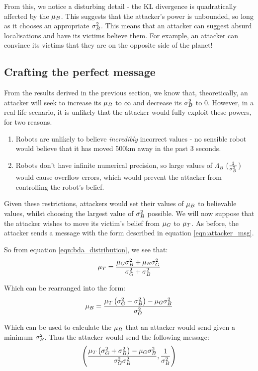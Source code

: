 From this, we notice a disturbing detail - the KL divergence is quadratically affected by the $\mu_B$. This suggests that the attacker's power is unbounded, so long as it chooses an appropriate $\sigma_B^2$. This means that an attacker can suggest absurd localisations and have its victims believe them. For example, an attacker can convince its victims that they are on the opposite side of the planet!

\subsection{Crafting the perfect message}
From the results derived in the previous section, we know that, theoretically, an attacker will seek to increase its $\mu_B$ to $\infty$ and decrease its $\sigma_B^2$ to 0. However, in a real-life scenario, it is unlikely that the attacker would fully exploit these powers, for two reasons.
\begin{enumerate}
	\item Robots are unlikely to believe \textit{incredibly} incorrect values - no sensible robot would believe that it has moved 500km away in the past 3 seconds.
	\item Robots don't have infinite numerical precision, so large values of $\Lambda_B$ ($\frac{1}{\sigma_B^2}$) would cause overflow errors, which would prevent the attacker from controlling the robot's belief.
\end{enumerate}

Given these restrictions, attackers would set their values of $\mu_B$ to believable values, whilst choosing the largest value of $\sigma_B^2$ possible. 
We will now suppose that the attacker wishes to move its victim's belief from $\mu_G$ to $\mu_T$.
As before, the attacker sends a message with the form described in equation \ref{eqn:attacker_msg}.

So from equation \ref{eqn:bda_distribution}, we see that:
\begin{equation}
	\mu_T = \frac{\mu_G\sigma_B^2 + \mu_B\sigma_G^2}{\sigma_G^2 + \sigma_B^2}
\end{equation}

Which can be rearranged into the form:
\begin{equation}
	\mu_B = \frac{\mu_T\left(\sigma_G^2 + \sigma_B^2\right) - \mu_G\sigma_B^2}{\sigma_G^2}
\end{equation}

Which can be used to calculate the $\mu_B$ that an attacker would send given a minimum $\sigma_B^2$. 
Thus the attacker would send the following message:
\begin{equation}
	\left(\frac{\mu_T\left(\sigma_G^2 + \sigma_B^2\right) - \mu_G\sigma_B^2}{\sigma_G^2\sigma_B^2}, \frac{1}{\sigma_B^2}\right)
\end{equation}

